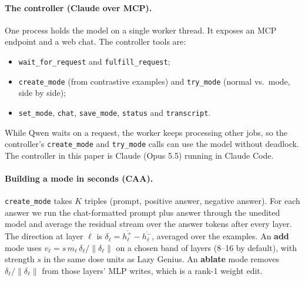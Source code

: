 \paragraph{The controller (Claude over MCP).} One process holds the model on a single worker thread. It exposes an MCP endpoint and a web chat. The controller tools are:
\begin{itemize}
\item \texttt{wait\_for\_request} and \texttt{fulfill\_request};
\item \texttt{create\_mode} (from contrastive examples) and \texttt{try\_mode} (normal vs.\ mode, side by side);
\item \texttt{set\_mode}, \texttt{chat}, \texttt{save\_mode}, \texttt{status} and \texttt{transcript}.
\end{itemize}
While Qwen waits on a request, the worker keeps processing other jobs, so the controller's \texttt{create\_mode} and \texttt{try\_mode} calls can use the model without deadlock. The controller in this paper is Claude (Opus 5.5) running in Claude Code.

\paragraph{Building a mode in seconds (CAA).} \texttt{create\_mode} takes $K$ triples (prompt, positive answer, negative answer). For each answer we run the chat-formatted prompt plus answer through the unedited model and average the residual stream over the answer tokens after every layer. The direction at layer $\ell$ is $\delta_\ell=\overline{h^{+}_\ell}-\overline{h^{-}_\ell}$, averaged over the examples. An \textbf{add} mode uses $v_\ell=s\, m_\ell\,\delta_\ell/\lVert\delta_\ell\rVert$ on a chosen band of layers (8--16 by default), with strength $s$ in the same dose units as Lazy Genius. An \textbf{ablate} mode removes $\delta_\ell/\lVert\delta_\ell\rVert$ from those layers' MLP writes, which is a rank-1 weight edit.
